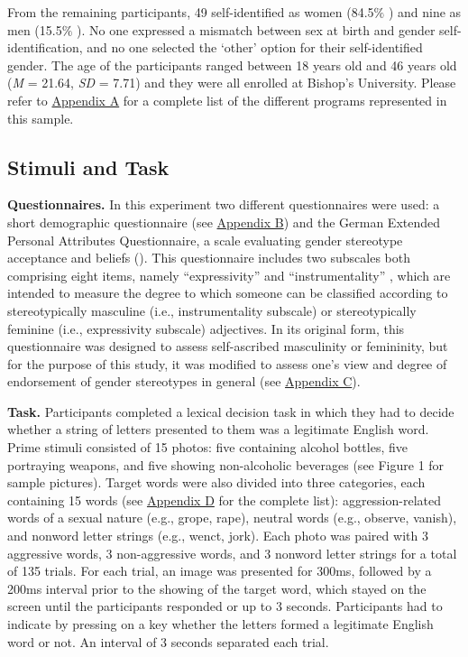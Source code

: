 \documentclass[serif, authorddate, twocolumn, empirical]{jote-article}
\begin{document}
From the remaining participants, 49 self-identified as women (84.5$\%$ ) and nine as men (15.5$\%$ ). No one expressed a mismatch between sex at birth and gender self-identification, and no one selected the ‘other’ option for their self-identified gender. The age of the participants ranged between 18 years old and 46 years old (\textit{M }= 21.64, \textit{SD }= 7.71) and they were all enrolled at Bishop’s University. Please refer to \hyperlink{A}{Appendix A} for a complete list of the different programs represented in this sample.

\subsection*{Stimuli and Task}
\textbf{Questionnaires.} In this experiment two different questionnaires were used: a short demographic questionnaire (see \hyperlink{B}{Appendix B}) and the German Extended Personal Attributes Questionnaire, a scale evaluating gender stereotype acceptance and beliefs (\cite{RungeFreyGollwitzerHelmreichSpence1981}). This questionnaire includes two subscales both comprising eight items, namely ``expressivity” and ``instrumentality” , which are intended to measure the degree to which someone can be classified according to stereotypically masculine (i.e., instrumentality subscale) or stereotypically feminine (i.e., expressivity subscale) adjectives. In its original form, this questionnaire was designed to assess self-ascribed masculinity or femininity, but for the purpose of this study, it was modified to assess one’s view and degree of endorsement of gender stereotypes in general (see \hyperlink{C}{Appendix C}). 

\textbf{Task.} Participants completed a lexical decision task in which they had to decide whether a string of letters presented to them was a legitimate English word. Prime stimuli consisted of 15 photos: five containing alcohol bottles, five portraying weapons, and five showing non-alcoholic beverages (see Figure 1 for sample pictures). Target words were also divided into three categories, each containing 15 words (see \hyperlink{D}{Appendix D}  for the complete list): aggression-related words of a sexual nature (e.g., grope, rape), neutral words (e.g., observe, vanish), and nonword letter strings (e.g., wenct, jork). Each photo was paired with 3 aggressive words, 3 non-aggressive words, and 3 nonword letter strings for a total of 135 trials. For each trial, an image was presented for 300ms, followed by a 200ms interval prior to the showing of the target word, which stayed on the screen until the participants responded or up to 3 seconds. Participants had to indicate by pressing on a key whether the letters formed a legitimate English word or not. An interval of 3 seconds separated each trial.
\end{document}
